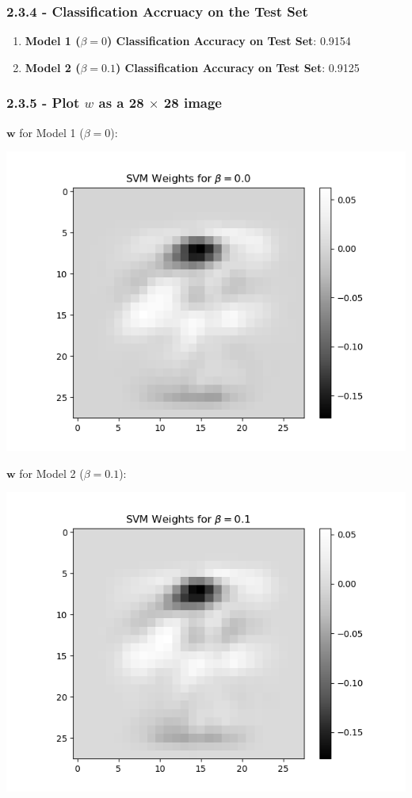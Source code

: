 \documentclass[10pt]{article}
\begin{document}
\subsubsection{2.3.4 - Classification Accruacy on the Test Set}

\begin{enumerate}
\item \textbf{Model 1 ($\beta = 0 $) Classification Accuracy on Test Set}: 0.9154
\item \textbf{Model 2 ($\beta = 0.1 $) Classification Accuracy on Test Set}: 0.9125
\end{enumerate}


\subsubsection{2.3.5 - Plot \textbf{$w$} as a 28 $\times $ 28 image }

$\textbf{w}$ for Model 1 ($\beta = 0 $): 

\begin{center}
\includegraphics[scale=0.5]{2_3_1.png}
\end{center}

$\textbf{w}$ for Model 2 ($\beta = 0.1 $): 

\begin{center}
\includegraphics[scale=0.5]{2_3_2.png}
\end{center}
\end{document}
